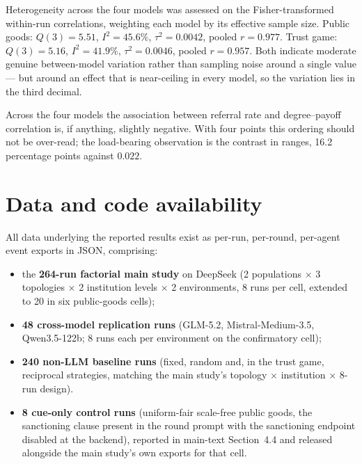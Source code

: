 \documentclass[11pt,a4paper]{article}
\begin{document}
Heterogeneity across the four models was assessed on the
Fisher-transformed within-run correlations, weighting each model by
its effective sample size. Public goods: $Q(3)=5.51$, $I^2=45.6\%$,
$\tau^2=0.0042$, pooled $r=0.977$. Trust game: $Q(3)=5.16$,
$I^2=41.9\%$, $\tau^2=0.0046$, pooled $r=0.957$. Both indicate
moderate genuine between-model variation rather than sampling noise
around a single value --- but around an effect that is near-ceiling in
every model, so the variation lies in the third decimal.

Across the four models the association between referral rate and
degree--payoff correlation is, if anything, slightly negative. With
four points this ordering should not be over-read; the load-bearing
observation is the contrast in ranges, 16.2 percentage points against
$0.022$.

\section{Data and code availability}
\label{sec:s12}

All data underlying the reported results exist as per-run, per-round,
per-agent event exports in JSON, comprising:

\begin{itemize}[leftmargin=1.5em]
  \item the \textbf{264-run factorial main study} on DeepSeek
  (2 populations $\times$ 3 topologies $\times$ 2 institution levels
  $\times$ 2 environments, 8 runs per cell, extended to 20 in six
  public-goods cells);
  \item \textbf{48 cross-model replication runs} (GLM-5.2,
  Mistral-Medium-3.5, Qwen3.5-122b; 8 runs each per environment on the
  confirmatory cell);
  \item \textbf{240 non-LLM baseline runs} (fixed, random and, in the
  trust game, reciprocal strategies, matching the main study's
  topology $\times$ institution $\times$ 8-run design).
  \item \textbf{8 cue-only control runs} (uniform-fair scale-free
  public goods, the sanctioning clause present in the round prompt
  with the sanctioning endpoint disabled at the backend), reported in
  main-text Section~4.4 and released alongside the main study's own
  exports for that cell.
\end{itemize}
\end{document}
